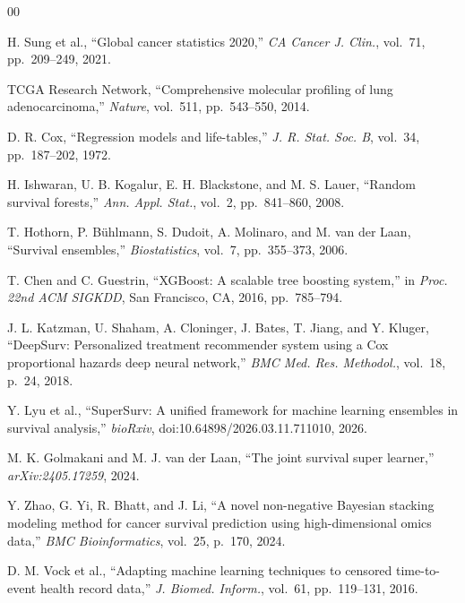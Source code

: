 \documentclass[conference]{IEEEtran}
\begin{document}
\begin{thebibliography}{00}

H. Sung et al., ``Global cancer statistics 2020,''
\textit{CA Cancer J. Clin.}, vol.~71, pp.~209--249, 2021.

TCGA Research Network, ``Comprehensive molecular profiling of lung
adenocarcinoma,'' \textit{Nature}, vol.~511, pp.~543--550, 2014.

D. R. Cox, ``Regression models and life-tables,''
\textit{J. R. Stat. Soc. B}, vol.~34, pp.~187--202, 1972.

H. Ishwaran, U. B. Kogalur, E. H. Blackstone, and M. S. Lauer,
``Random survival forests,''
\textit{Ann. Appl. Stat.}, vol.~2, pp.~841--860, 2008.

T. Hothorn, P. B\"{u}hlmann, S. Dudoit, A. Molinaro, and M. van der Laan,
``Survival ensembles,''
\textit{Biostatistics}, vol.~7, pp.~355--373, 2006.

T. Chen and C. Guestrin, ``XGBoost: A scalable tree boosting system,''
in \textit{Proc. 22nd ACM SIGKDD}, San Francisco, CA, 2016, pp.~785--794.

J. L. Katzman, U. Shaham, A. Cloninger, J. Bates, T. Jiang, and Y. Kluger,
``DeepSurv: Personalized treatment recommender system using a Cox
proportional hazards deep neural network,''
\textit{BMC Med. Res. Methodol.}, vol.~18, p.~24, 2018.

Y. Lyu et al., ``SuperSurv: A unified framework for machine learning
ensembles in survival analysis,''
\textit{bioRxiv}, doi:10.64898/2026.03.11.711010, 2026.

M. K. Golmakani and M. J. van der Laan, ``The joint survival super learner,''
\textit{arXiv:2405.17259}, 2024.

Y. Zhao, G. Yi, R. Bhatt, and J. Li, ``A novel non-negative Bayesian
stacking modeling method for cancer survival prediction using
high-dimensional omics data,''
\textit{BMC Bioinformatics}, vol.~25, p.~170, 2024.

D. M. Vock et al., ``Adapting machine learning techniques to censored
time-to-event health record data,''
\textit{J. Biomed. Inform.}, vol.~61, pp.~119--131, 2016.


\end{thebibliography}
\end{document}
